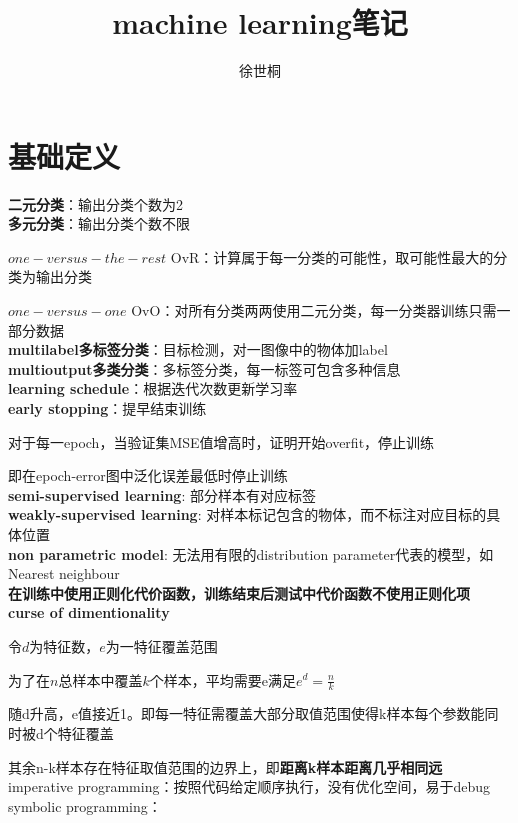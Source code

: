 \documentclass[UTF8]{ctexart}
\title{machine learning笔记}
\author{徐世桐}
\date{}
\begin{document}
\maketitle

\section{基础定义}
\noindent \textbf{二元分类}：输出分类个数为2\\
\textbf{多元分类}：输出分类个数不限

  $one-versus-the-rest$ OvR：计算属于每一分类的可能性，取可能性最大的分类为输出分类

  $one-versus-one$ OvO：对所有分类两两使用二元分类，每一分类器训练只需一部分数据\\
\textbf{multilabel多标签分类}：目标检测，对一图像中的物体加label\\
\textbf{multioutput多类分类}：多标签分类，每一标签可包含多种信息\\
\textbf{learning schedule}：根据迭代次数更新学习率\\
\textbf{early stopping}：提早结束训练

  对于每一epoch，当验证集MSE值增高时，证明开始overfit，停止训练

  即在epoch-error图中泛化误差最低时停止训练\\
\textbf{semi-supervised learning}: 部分样本有对应标签\\
\textbf{weakly-supervised learning}: 对样本标记包含的物体，而不标注对应目标的具体位置\\
\textbf{non parametric model}: 无法用有限的distribution parameter代表的模型，如Nearest neighbour\\
\textbf{在训练中使用正则化代价函数，训练结束后测试中代价函数不使用正则化项}\\
\textbf{curse of dimentionality}

  令$d$为特征数，$e$为一特征覆盖范围

  为了在$n$总样本中覆盖$k$个样本，平均需要e满足$e^d = \frac{n}{k}$

  随d升高，e值接近1。即每一特征需覆盖大部分取值范围使得k样本每个参数能同时被d个特征覆盖

  其余n-k样本存在特征取值范围的边界上，即\textbf{距离k样本距离几乎相同远}\\
imperative programming：按照代码给定顺序执行，没有优化空间，易于debug\\
symbolic programming：
\end{document}
